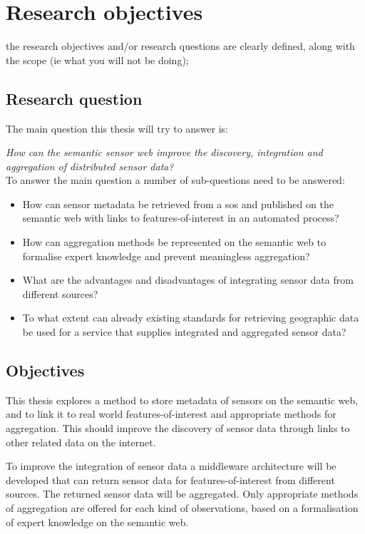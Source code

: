 
\chapter{Research objectives}
\label{chap:objectives}

the research objectives and/or research questions are clearly defined, along with the scope (ie what you will not be doing);\\

\section{Research question} 
The main question this thesis will try to answer is: 

\textit{How can the semantic sensor web improve the discovery, integration and aggregation of distributed sensor data?}\\

To answer the main question a number of sub-questions need to be answered:
\begin{itemize}
	\item How can sensor metadata be retrieved from a \ac{sos} and published on the semantic web with links to features-of-interest in an automated process?
	\item How can aggregation methods be represented on the semantic web to formalise expert knowledge and prevent meaningless aggregation?
	\item What are the advantages and disadvantages of integrating sensor data from different sources?
	\item To what extent can already existing standards for retrieving geographic data be used for a service that supplies integrated and aggregated sensor data?
\end{itemize}

\section{Objectives}

This thesis explores a method to store metadata of sensors on the semantic web, and to link it to real world features-of-interest and appropriate methods for aggregation. This should improve the discovery of sensor data through links to other related data on the internet.  

To improve the integration of sensor data a middleware architecture will be developed that can return sensor data for features-of-interest from different sources. The returned sensor data will be aggregated. Only appropriate methods of aggregation are offered for each kind of observations, based on a formalisation of expert knowledge on the semantic web.

